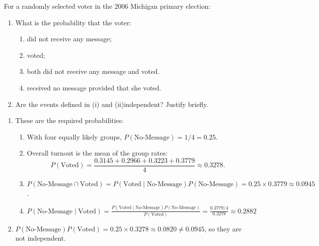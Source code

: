 \documentclass[11pt]{exam}
\begin{document}
\begin{questions}

\question[2] For a randomly selected voter in the 2006 Michigan primary election:
\begin{enumerate}[label=(\alph*)]
\item What is the probability that the voter:
  \begin{enumerate}[label=(\roman*)]
    \item did not receive any message;
    \item voted;
    \item both did not receive any message and voted.
    \item received no message provided that she voted.
  \end{enumerate}
\item Are the events defined in (i) and (ii)independent? Justify briefly.
\end{enumerate}

\begin{solution}
\begin{enumerate}[label=(\alph*)]
\item These are the required probabilities:
    \begin{enumerate}[label=(\roman*)]
        \item With four equally likely groups, $P(\text{No-Message})=1/4=0.25$.  
        \item Overall turnout is the mean of the group rates:
        \[
        P(\text{Voted})=\frac{0.3145+0.2966+0.3223+0.3779}{4} \approx 0.3278.
        \]
        \item $
        P(\text{No-Message}\cap\text{Voted}) 
        = P(\text{Voted} \mid \text{No-Message}) P(\text{No-Message}) 
        = 0.25\times0.3779 \approx 0.0945
        $.
        \item $
        P(\text{No-Message} \mid \text{Voted}) 
        = \frac{P(\text{Voted} \mid \text{No-Message})P(\text{No-Message})}{P(\text{Voted})} 
        = \frac{0.3779 / 4}{0.3278} \approx 0.2882
        $
    \end{enumerate}
    \item $P(\text{No-Message})P(\text{Voted}) = 0.25\times0.3278 \approx 0.0820 \neq 0.0945$, so they are not independent.
\end{enumerate}
\end{solution}


\end{questions}
\end{document}
